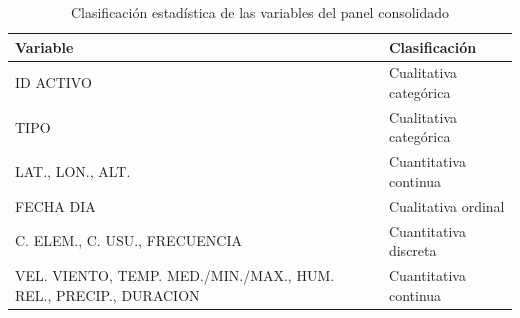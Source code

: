 \begin{table}[H]
\centering
\small
\caption{Clasificación estadística de las variables del panel consolidado}
\label{tab:clasificacion_variables}
\begin{tabularx}{0.85\textwidth}{
>{\raggedright\arraybackslash}p{5.5cm}
>{\raggedright\arraybackslash}X
}
\toprule
\textbf{Variable} & \textbf{Clasificación} \\
\midrule
ID ACTIVO & Cualitativa categórica \\
TIPO & Cualitativa categórica \\
LAT., LON., ALT. & Cuantitativa continua \\
FECHA DIA & Cualitativa ordinal \\
C. ELEM., C. USU., FRECUENCIA & Cuantitativa discreta \\
VEL. VIENTO, TEMP. MED./MIN./MAX., HUM. REL., PRECIP., DURACION & Cuantitativa continua \\
\bottomrule
\end{tabularx}
\end{table}

